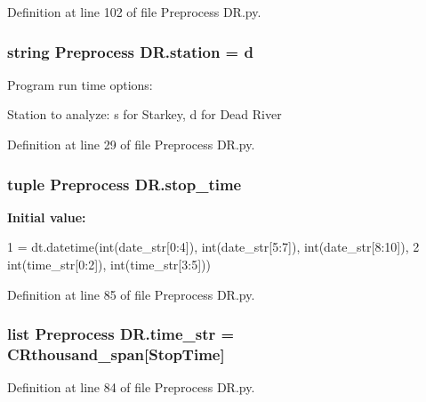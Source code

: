 Definition at line 102 of file Preprocess D\+R.\+py.

\hypertarget{namespace_preprocess_01_d_r_aae6f3cd9de873f4f53dd09d43f047642}{}
\subsubsection[{station}]{\setlength{\rightskip}{0pt plus 5cm}string Preprocess D\+R.\+station = \textquotesingle{}d\textquotesingle{}}\label{namespace_preprocess_01_d_r_aae6f3cd9de873f4f53dd09d43f047642}


Program run time options\+: 

Station to analyze\+: \textquotesingle{}s\textquotesingle{} for Starkey, \textquotesingle{}d\textquotesingle{} for Dead River 

Definition at line 29 of file Preprocess D\+R.\+py.

\hypertarget{namespace_preprocess_01_d_r_a026e495ab57bb5f630a98c27cf13c1aa}{}
\subsubsection[{stop\+\_\+time}]{\setlength{\rightskip}{0pt plus 5cm}tuple Preprocess D\+R.\+stop\+\_\+time}\label{namespace_preprocess_01_d_r_a026e495ab57bb5f630a98c27cf13c1aa}
{\bfseries Initial value\+:}
\begin{DoxyCode}
1 = dt.datetime(int(date\_str[0:4]), int(date\_str[5:7]), int(date\_str[8:10]),
2                                     int(time\_str[0:2]), int(time\_str[3:5]))
\end{DoxyCode}


Definition at line 85 of file Preprocess D\+R.\+py.

\hypertarget{namespace_preprocess_01_d_r_afe9443eef87a2a031c1106acc31cb166}{}
\subsubsection[{time\+\_\+str}]{\setlength{\rightskip}{0pt plus 5cm}list Preprocess D\+R.\+time\+\_\+str = {\bf C\+Rthousand\+\_\+span}\mbox{[}\textquotesingle{}Stop\+Time\textquotesingle{}\mbox{]}}\label{namespace_preprocess_01_d_r_afe9443eef87a2a031c1106acc31cb166}


Definition at line 84 of file Preprocess D\+R.\+py.

